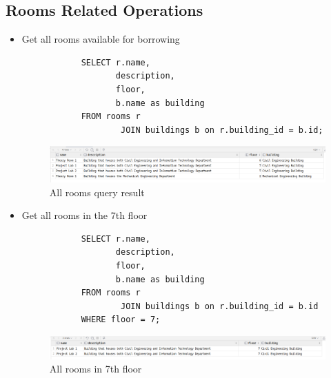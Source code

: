 \documentclass[12pt,titlepage]{article}
\begin{document}
\subsection{Rooms Related Operations}
\begin{itemize}
    \item {
        Get all rooms available for borrowing

        \begin{verbatim}
            SELECT r.name,
                   description,
                   floor,
                   b.name as building
            FROM rooms r
                    JOIN buildings b on r.building_id = b.id;
        \end{verbatim}

        \begin{figure}[h]
            \centering
            \includegraphics[width=\textwidth]{images/all-rooms-query.png}
            \caption{All rooms query result}
        \end{figure}
    }
    \item {
        Get all rooms in the 7th floor

        \begin{verbatim}
            SELECT r.name,
                   description,
                   floor,
                   b.name as building
            FROM rooms r
                    JOIN buildings b on r.building_id = b.id
            WHERE floor = 7;
        \end{verbatim}

        \begin{figure}[h]
            \centering
            \includegraphics[width=\textwidth]{images/7th-floor-query.png}
            \caption{All rooms in 7th floor}
        \end{figure}
    }
\end{itemize}
\end{document}
